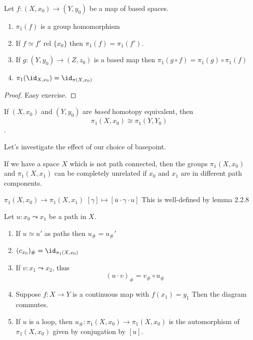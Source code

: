 \documentclass{article}
\numberwithin{nthm}{subsection}
\begin{document}
\begin{prop}
    Let $f: (X, x_0) \to (Y, y_0)$ be a map of based spaces.
    \begin{enumerate}[label=(\roman*)]
        \item $\pi_1(f)$ is a group homomorphism
        \item If $f \simeq f'$ rel $\{x_0\}$ then $\pi_1(f) = \pi_1(f')$.
        \item If $g: (Y, y_0) \to (Z, z_0)$ is a based map then $\pi_1(g \circ f) = \pi_1(g) \circ \pi_1(f)$
        \item $\pi_1(\id_{X, x_0}) = \id_{\pi(X, x_0)}$
    \end{enumerate}
\end{prop}

\begin{proof}
    Easy exercise.
\end{proof}

\begin{cor}
    If $(X, x_0)$ and $(Y, y_0)$ are \emph{based} homotopy equivalent, then \begin{equation*}\pi_1(X, x_0) \cong \pi_1(Y, Y_0)\end{equation*}.
\end{cor}

Let's investigate the effect of our choice of basepoint.

If we have a space $X$ which is not path connected, then the groups $\pi_1(X, x_0)$ and $\pi_1(X, x_1)$ can be completely unrelated if $x_0$ and $x_1$ are in different path components.

$\pi_1(X, x_0) \to \pi_1(X, x_1)$
$[\gamma] \mapsto [\overline{u} \cdot \gamma \cdot u]$
This is well-defined by lemma 2.2.8

\begin{prop}
    Let $u: x_0 \leadsto x_1$ be a path in $X$.
    \begin{enumerate}[label=(\roman*)]
        \setcounter{enumi}{0}
        \item If $u \simeq u'$ as paths then $u_{\#} = u_{\#}'$
        \item $(c_{x_0})_{\#} = \id_{\pi_1(X, x_0)}$
        \item If $v: x_1 \leadsto x_2$, thus
            \begin{equation*}
                (u \cdot v)_{\#} = v_{\#} \circ u_{\#}
            \end{equation*}

        \item Suppose $f:X \to Y$ is a continuous map with $f(x_1) = y_1$
                Then the diagram commutes.
        \item If $u$ is a loop, then $u_{\#}: \pi_1(X, x_0) \to \pi_1(X, x_0)$ is the automorphism of $\pi_1(X, x_0)$ given by conjugation by $[u]$.
    \end{enumerate}
\end{prop}
\end{document}
